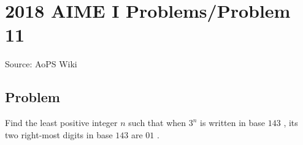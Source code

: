 \documentclass[12pt]{article}
\begin{document}
\section*{{2018 AIME I Problems/Problem 11}}
Source: AoPS Wiki

\subsection*{Problem}
Find the least positive integer $n$ such that when $3^n$ is written in base $143$ , its two right-most digits in base $143$ are $01$ .
\end{document}
